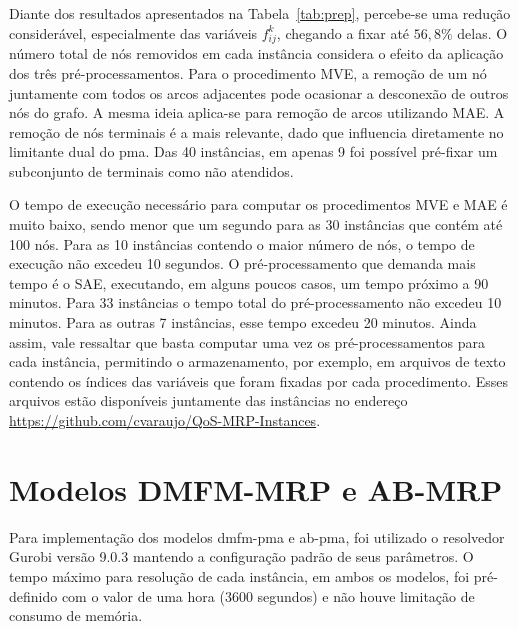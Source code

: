Diante  dos resultados  apresentados  na  Tabela~\ref{tab:prep}, percebe-se  uma
redução considerável,  especialmente das variáveis $f_{ij}^k$,  chegando a fixar
até $56,8\%$ delas. O número total  de nós removidos em cada instância considera
o efeito  da aplicação dos três  pré-processamentos. Para o procedimento  MVE, a
remoção  de um  nó juntamente  com todos  os arcos  adjacentes pode  ocasionar a
desconexão de outros nós do grafo. A mesma ideia aplica-se para remoção de arcos
utilizando  MAE.  A remoção  de  nós  terminais é  a  mais  relevante, dado  que
influencia diretamente  no limitante  dual do \gls{pma}.  Das 40  instâncias, em
apenas 9 foi possível pré-fixar um subconjunto de terminais como não atendidos.

O tempo de execução necessário para computar  os procedimentos MVE e MAE é muito
baixo, sendo menor que um segundo para  as 30 instâncias que contém até 100 nós.
Para as 10  instâncias contendo o maior  número de nós, o tempo  de execução não
excedeu  10 segundos.  O  pré-processamento  que demanda  mais  tempo  é o  SAE,
executando,  em alguns  poucos casos,  um tempo  próximo a  90 minutos.  Para 33
instâncias o  tempo total do pré-processamento  não excedeu 10 minutos.  Para as
outras 7 instâncias, esse tempo excedeu  20 minutos. Ainda assim, vale ressaltar
que basta computar uma vez os pré-processamentos para cada instância, permitindo
o  armazenamento, por  exemplo, em  arquivos de  texto contendo  os índices  das
variáveis  que  foram  fixadas  por  cada  procedimento.  Esses  arquivos  estão
disponíveis       juntamente       das        instâncias       no       endereço
\url{https://github.com/cvaraujo/QoS-MRP-Instances}.

\section{Modelos DMFM-MRP e AB-MRP} \label{sec:modelos}

Para implementação  dos modelos \gls{dmfm-pma}  e \gls{ab-pma}, foi  utilizado o
resolvedor  Gurobi  versão   9.0.3  mantendo  a  configuração   padrão  de  seus
parâmetros.  O tempo  máximo  para  resolução de  cada  instância,  em ambos  os
modelos, foi pré-definido  com o valor de  uma hora (3600 segundos)  e não houve
limitação de consumo de memória.

